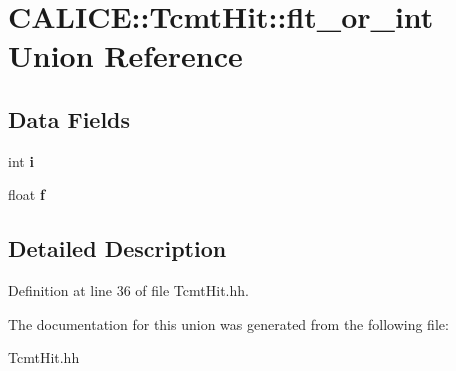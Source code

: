 \section{C\-A\-L\-I\-C\-E\-:\-:Tcmt\-Hit\-:\-:flt\-\_\-or\-\_\-int Union Reference}
\label{unionCALICE_1_1TcmtHit_1_1flt__or__int}
\subsection*{Data Fields}
\begin{DoxyCompactItemize}
\item 
int {\bfseries i}\label{unionCALICE_1_1TcmtHit_1_1flt__or__int_af9190e5d7578fdb27def516352cdc7a5}

\item 
float {\bfseries f}\label{unionCALICE_1_1TcmtHit_1_1flt__or__int_ac5eb6eb93f72bf7f388dff218559a362}

\end{DoxyCompactItemize}


\subsection{Detailed Description}


Definition at line 36 of file Tcmt\-Hit.\-hh.



The documentation for this union was generated from the following file\-:\begin{DoxyCompactItemize}
\item 
Tcmt\-Hit.\-hh\end{DoxyCompactItemize}
